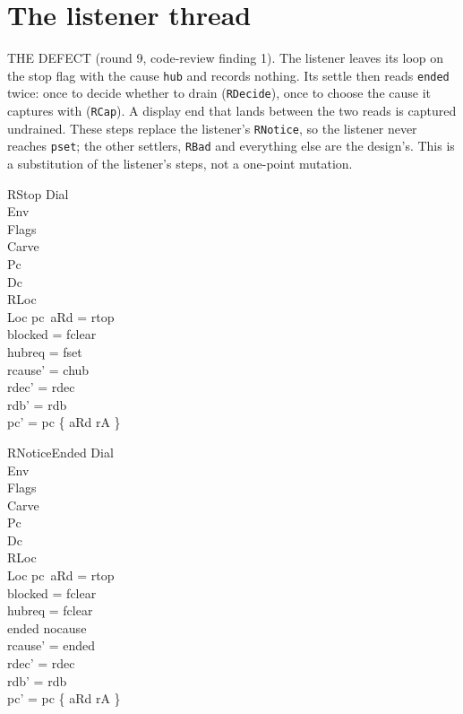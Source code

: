 \documentclass[a4paper,10pt,fleqn]{article}
\begin{document}
\section{The listener thread}

THE DEFECT (round 9, code-review finding 1).  The listener leaves its loop on
the stop flag with the cause \texttt{hub} and records nothing.  Its settle then
reads \texttt{ended} twice: once to decide whether to drain (\texttt{RDecide}),
once to choose the cause it captures with (\texttt{RCap}).  A display end that
lands between the two reads is captured undrained.  These steps replace the
listener's \texttt{RNotice}, so the listener never reaches \texttt{pset}; the
other settlers, \texttt{RBad} and everything else are the design's.  This is a
substitution of the listener's steps, not a one-point mutation.

\begin{schema}{RStop}
  \Xi Dial \\ \Xi Env \\ \Xi Flags \\ \Xi Carve \\ \Delta Pc \\ \Xi Dc \\
  \Delta RLoc \\ \Xi Loc
\where
  pc~aRd = rtop \\
  blocked = fclear \\
  hubreq = fset \\
  rcause' = chub \\
  rdec' = rdec \\
  rdb' = rdb \\
  pc' = pc \oplus \{ aRd \mapsto rA \}
\end{schema}

\begin{schema}{RNoticeEnded}
  \Xi Dial \\ \Xi Env \\ \Xi Flags \\ \Xi Carve \\ \Delta Pc \\ \Xi Dc \\
  \Delta RLoc \\ \Xi Loc
\where
  pc~aRd = rtop \\
  blocked = fclear \\
  hubreq = fclear \\
  ended \neq nocause \\
  rcause' = ended \\
  rdec' = rdec \\
  rdb' = rdb \\
  pc' = pc \oplus \{ aRd \mapsto rA \}
\end{schema}
\end{document}
